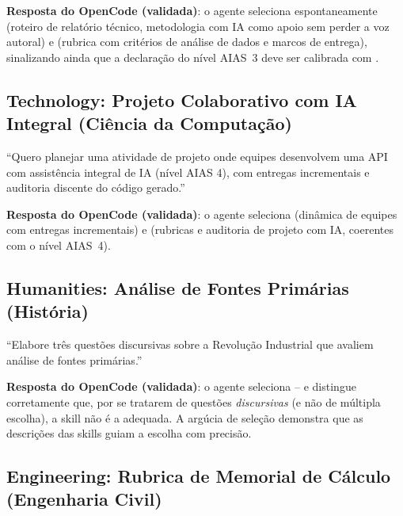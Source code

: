 \textbf{Resposta do OpenCode (validada)}: o agente seleciona espontaneamente  (roteiro de relat{\'o}rio t{\'e}cnico, metodologia com IA como apoio sem perder a voz autoral) e  (rubrica com crit{\'e}rios de an{\'a}lise de dados e marcos de entrega), sinalizando ainda que a declara{\c c}{\~a}o do n{\'i}vel AIAS~3 deve ser calibrada com .

\subsection{Technology: Projeto Colaborativo com IA Integral (Ci{\^e}ncia da Computa{\c c}{\~a}o)}

\begin{tcolorbox}[colback=white, colframe=boxborder, arc=1mm, title={Prompt Validado -- Technology}]
\small
``Quero planejar uma atividade de projeto onde equipes desenvolvem uma API com assist{\^e}ncia integral de IA (n{\'i}vel AIAS 4), com entregas incrementais e auditoria discente do c{\'o}digo gerado.''
\end{tcolorbox}

\textbf{Resposta do OpenCode (validada)}: o agente seleciona  (din{\^a}mica de equipes com entregas incrementais) e  (rubricas e auditoria de projeto com IA, coerentes com o n{\'i}vel AIAS~4).

\subsection{Humanities: An{\'a}lise de Fontes Prim{\'a}rias (Hist{\'o}ria)}

\begin{tcolorbox}[colback=white, colframe=boxborder, arc=1mm, title={Prompt Validado -- Humanities}]
\small
``Elabore tr{\^e}s quest{\~o}es discursivas sobre a Revolu{\c c}{\~a}o Industrial que avaliem an{\'a}lise de fontes prim{\'a}rias.''
\end{tcolorbox}

\textbf{Resposta do OpenCode (validada)}: o agente seleciona  -- e distingue corretamente que, por se tratarem de quest{\~o}es \emph{discursivas} (e n{\~a}o de m{\'u}ltipla escolha), a skill  n{\~a}o {\'e} a adequada. A arg{\'u}cia de sele{\c c}{\~a}o demonstra que as descri{\c c}{\~o}es das skills guiam a escolha com precis{\~a}o.

\subsection{Engineering: Rubrica de Memorial de C{\'a}lculo (Engenharia Civil)}

